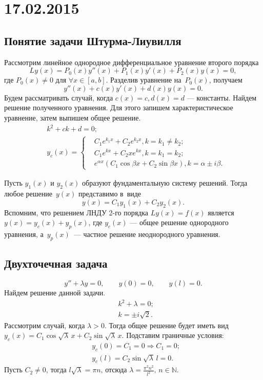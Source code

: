 \section{17.02.2015}
\subsection{Понятие задачи Штурма-Лиувилля}

Рассмотрим линейное однородное дифференциальное уравнение второго порядка
$$
	Ly(x) = P_0(x) y''(x) + P_1(x) y'(x) + P_2(x) y(x) = 0,
$$
где $P_0(x) \ne 0 \text{ для } \forall x \in [a,b]$. Разделив уравнение на~$P_0(x)$, получаем
$$
	y''(x) + c(x)y'(x) + d(x)y(x) = 0.
$$
Будем рассматривать случай, когда $c(x) = c, d(x) = d$ --- константы. Найдем решение полученного уравнения. Для этого запишем характеристическое уравнение, затем выпишем общее решение.
\begin{align*}
	&k^2 + c k + d = 0; \\
	&y_{c}(x) = 
	\begin{cases}
		&C_1 e^{k_1 x} + C_2 e^{k_2 x}, k = k_1 \ne k_2; \\
		&C_1 e^{k x} + C_2 x e^{k x}, k = k_1 = k_2; \\
		&e^{\alpha x} (C_1 \cos{\beta x} + C_2 \sin{\beta x}), k = \alpha \pm i \beta.
	\end{cases}
\end{align*}

Пусть $y_1(x)$ и $y_2(x)$ образуют фундаментальную систему решений. Тогда любое решение~$y(x)$ представимо в~виде
$$
	y(x) = C_1 y_1(x) + C_2 y_2(x).
$$
Вспомним, что решением ЛНДУ 2-го порядка $Ly(x) = f(x)$ является $y(x) = y_{c}(x) + y_{p}(x)$, где $y_{c}(x)$ --- общее решение однородного уравнения, а~$y_{p}(x)$~--- частное решение неоднородного уравнения.

\subsection{Двухточечная задача}
\begin{example}
	$$
		y''+ \lambda y = 0, \qquad y(0) = 0, \qquad y(l) = 0.
	$$
	Найдем решение данной задачи.
	\begin{align*}
		&k^2 + \lambda = 0; \\
		&k = \pm i \sqrt{2}.
	\end{align*}
	Рассмотрим случай, когда $\lambda > 0$. Тогда общее решение будет иметь вид $y_{c}(x) = C_1 \cos{\sqrt{\lambda}\,x} + C_2 \sin{\sqrt{\lambda}\,x}$. Подставим граничные условия:
	\begin{align*}
		&y_{c}(0) = C_1 = 0 \Longrightarrow C_1 = 0; \\
		&y_{c}(l) = C_2 \sin{\sqrt{\lambda}\,l} = 0.
	\end{align*}
	Пусть $C_2 \ne 0$, тогда $l \sqrt\lambda = \pi n \text{, отсюда } \lambda = \frac{\pi^2 n^2}{l^2},\,n \in \mathbb{N}$.
\end{example}

